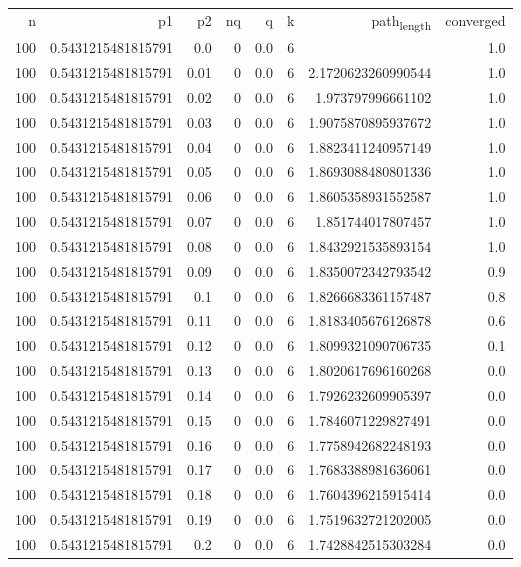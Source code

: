 \documentclass[11pt]{article}
\begin{document}
\begin{center}
\begin{tabular}{rrrrrrrr}
n & p1 & p2 & nq & q & k & path\textsubscript{length} & converged\\
100 & 0.5431215481815791 & 0.0 & 0 & 0.0 & 6 &  & 1.0\\
100 & 0.5431215481815791 & 0.01 & 0 & 0.0 & 6 & 2.1720623260990544 & 1.0\\
100 & 0.5431215481815791 & 0.02 & 0 & 0.0 & 6 & 1.973797996661102 & 1.0\\
100 & 0.5431215481815791 & 0.03 & 0 & 0.0 & 6 & 1.9075870895937672 & 1.0\\
100 & 0.5431215481815791 & 0.04 & 0 & 0.0 & 6 & 1.8823411240957149 & 1.0\\
100 & 0.5431215481815791 & 0.05 & 0 & 0.0 & 6 & 1.8693088480801336 & 1.0\\
100 & 0.5431215481815791 & 0.06 & 0 & 0.0 & 6 & 1.8605358931552587 & 1.0\\
100 & 0.5431215481815791 & 0.07 & 0 & 0.0 & 6 & 1.851744017807457 & 1.0\\
100 & 0.5431215481815791 & 0.08 & 0 & 0.0 & 6 & 1.8432921535893154 & 1.0\\
100 & 0.5431215481815791 & 0.09 & 0 & 0.0 & 6 & 1.8350072342793542 & 0.9\\
100 & 0.5431215481815791 & 0.1 & 0 & 0.0 & 6 & 1.8266683361157487 & 0.8\\
100 & 0.5431215481815791 & 0.11 & 0 & 0.0 & 6 & 1.8183405676126878 & 0.6\\
100 & 0.5431215481815791 & 0.12 & 0 & 0.0 & 6 & 1.8099321090706735 & 0.1\\
100 & 0.5431215481815791 & 0.13 & 0 & 0.0 & 6 & 1.8020617696160268 & 0.0\\
100 & 0.5431215481815791 & 0.14 & 0 & 0.0 & 6 & 1.7926232609905397 & 0.0\\
100 & 0.5431215481815791 & 0.15 & 0 & 0.0 & 6 & 1.7846071229827491 & 0.0\\
100 & 0.5431215481815791 & 0.16 & 0 & 0.0 & 6 & 1.7758942682248193 & 0.0\\
100 & 0.5431215481815791 & 0.17 & 0 & 0.0 & 6 & 1.7683388981636061 & 0.0\\
100 & 0.5431215481815791 & 0.18 & 0 & 0.0 & 6 & 1.7604396215915414 & 0.0\\
100 & 0.5431215481815791 & 0.19 & 0 & 0.0 & 6 & 1.7519632721202005 & 0.0\\
100 & 0.5431215481815791 & 0.2 & 0 & 0.0 & 6 & 1.7428842515303284 & 0.0\\

\end{tabular}
\end{center}
\end{document}
